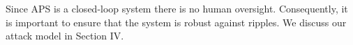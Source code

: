 Since APS is a closed-loop system there is no human oversight. Consequently, it is important to ensure that the system is robust against ripples. We discuss our attack model in Section IV. 







